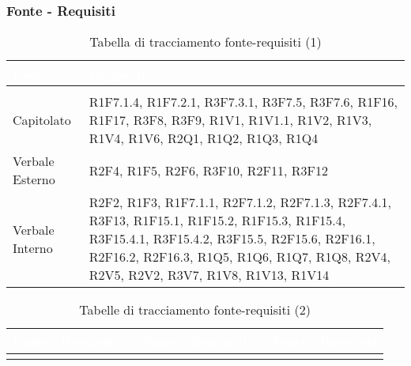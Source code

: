 \subsubsection{Fonte - Requisiti}
\renewcommand{\arraystretch}{1.5}
{
\setlength\arrayrulewidth{1pt}
\begin{longtable}{C{3cm} | C{12cm}}
		\textcolor{white}{\textbf{Fonte}} & 
		\textcolor{white}{\textbf{Requisiti}}\\
		\endfirsthead
	    \\
	    \endfoot
	    \caption{Tabella di tracciamento fonte-requisiti (1)}
	    \endlastfoot


Capitolato &  	R1F7.1.4, R1F7.2.1, R3F7.3.1, R3F7.5, R3F7.6, R1F16, R1F17, R3F8, R3F9, R1V1, R1V1.1, R1V2, R1V3, R1V4, R1V6, R2Q1, R1Q2, R1Q3, R1Q4 \\

Verbale Esterno & R2F4, R1F5, R2F6, R3F10, R2F11, R3F12 \\

Verbale Interno & 	R2F2, R1F3, R1F7.1.1, R2F7.1.2, R2F7.1.3, R2F7.4.1, R3F13, R1F15.1, R1F15.2, R1F15.3, R1F15.4, R3F15.4.1, R3F15.4.2, R3F15.5, R2F15.6, R2F16.1, R2F16.2, R2F16.3, R1Q5, R1Q6, R1Q7, R1Q8, R2V4, R2V5, R2V2, R3V7, R1V8, R1V13, R1V14 \\

\end{longtable}

\vspace{2cm}

\begin{longtable}{C{2cm} | C{2cm} C{0.5cm} C{2cm} | C{2cm} C{0.5cm} C{2cm} C{2cm}}
		\textcolor{white}{\textbf{Fonte}} & 
		\textcolor{white}{\textbf{Requisiti}} &
		 &
		\textcolor{white}{\textbf{Fonte}} & 
		\textcolor{white}{\textbf{Requisiti}} &
		 &
		\textcolor{white}{\textbf{Fonte}} & 
		\textcolor{white}{\textbf{Requisiti}} \\
		\endfirsthead
	    
	    \endfoot
	    \caption{Tabelle di tracciamento fonte-requisiti (2)}
	    \endlastfoot



\end{longtable}}
